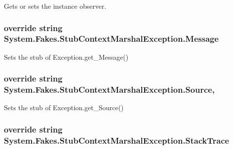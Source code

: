 Gets or sets the instance observer.

\hypertarget{class_system_1_1_fakes_1_1_stub_context_marshal_exception_a3a4d951c845b38580d11cd182fa0853d}{
\subsubsection[{Message}]{\setlength{\rightskip}{0pt plus 5cm}override string System.\-Fakes.\-Stub\-Context\-Marshal\-Exception.\-Message\hspace{0.3cm}{\ttfamily [get]}}}\label{class_system_1_1_fakes_1_1_stub_context_marshal_exception_a3a4d951c845b38580d11cd182fa0853d}


Sets the stub of Exception.\-get\-\_\-\-Message()

\hypertarget{class_system_1_1_fakes_1_1_stub_context_marshal_exception_abd7b6c24a73445a0f6d80e73e4c3e059}{
\subsubsection[{Source}]{\setlength{\rightskip}{0pt plus 5cm}override string System.\-Fakes.\-Stub\-Context\-Marshal\-Exception.\-Source\hspace{0.3cm}{\ttfamily [get]}, {\ttfamily [set]}}}\label{class_system_1_1_fakes_1_1_stub_context_marshal_exception_abd7b6c24a73445a0f6d80e73e4c3e059}


Sets the stub of Exception.\-get\-\_\-\-Source()

\hypertarget{class_system_1_1_fakes_1_1_stub_context_marshal_exception_a22cad0104c12a9f43f46a8389f8ed05d}{
\subsubsection[{Stack\-Trace}]{\setlength{\rightskip}{0pt plus 5cm}override string System.\-Fakes.\-Stub\-Context\-Marshal\-Exception.\-Stack\-Trace\hspace{0.3cm}{\ttfamily [get]}}}\label{class_system_1_1_fakes_1_1_stub_context_marshal_exception_a22cad0104c12a9f43f46a8389f8ed05d}


